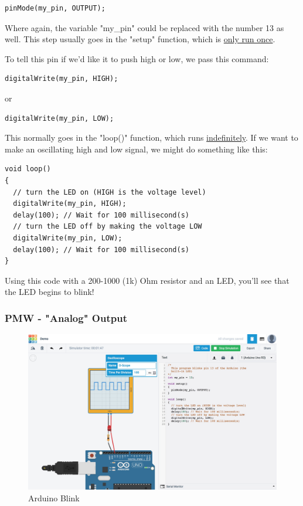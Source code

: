 \documentclass[a4paper]{article}
\begin{document}
\begin{verbatim}
pinMode(my_pin, OUTPUT);
\end{verbatim}

Where again, the variable "my\_pin" could be replaced with the number 13 as well. This step usually goes in the "setup" function, which is \underline{only run once}.

To tell this pin if we'd like it to push high or low, we pass this command:
\begin{verbatim}
digitalWrite(my_pin, HIGH);
\end{verbatim}
or
\begin{verbatim}
digitalWrite(my_pin, LOW);
\end{verbatim}

This normally goes in the "loop()" function, which runs \underline{indefinitely}. If we want to make an oscillating high and low signal, we might do something like this:

\begin{verbatim}
void loop()
{
  // turn the LED on (HIGH is the voltage level)
  digitalWrite(my_pin, HIGH);
  delay(100); // Wait for 100 millisecond(s)
  // turn the LED off by making the voltage LOW
  digitalWrite(my_pin, LOW);
  delay(100); // Wait for 100 millisecond(s)
}
\end{verbatim}

Using this code with a 200-1000 (1k) Ohm resistor and an LED, you'll see that the LED begins to blink!

\subsubsection{PMW - "Analog" Output}

\begin{figure}
\centering
\includegraphics[width=1\textwidth]{1-3.jpg}
\caption{\label{fig:arduino_ide}Arduino Blink}
\end{figure}
\end{document}
